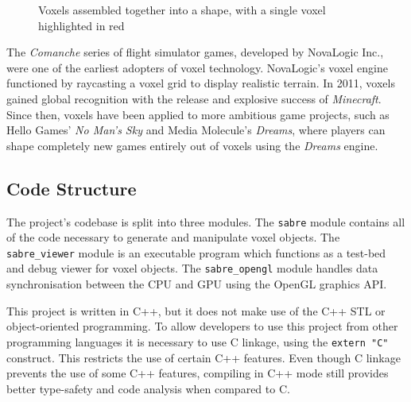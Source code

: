 \begin{figure}[h]
    \centering
    
    \caption{Voxels assembled together into a shape, with a single voxel highlighted in red \autocite{wiki:voxels_svg}}
    \label{fig:voxels_demo}
\end{figure}

The \textit{Comanche} series of flight simulator games, developed by NovaLogic Inc., 
were one of the earliest adopters of voxel technology. NovaLogic's voxel engine 
functioned by raycasting a voxel grid to display realistic terrain. In 2011, voxels 
gained global recognition with the release and explosive success of 
\textit{Minecraft}. Since then, voxels have been applied to more ambitious game 
projects, such as Hello Games' \textit{No Man's Sky} and Media Molecule's 
\textit{Dreams}, where players can shape completely new games entirely out of voxels 
using the \textit{Dreams} engine.

\subsection{Code Structure}
The project's codebase is split into three modules. The \texttt{sabre} module contains all of the code necessary to generate and manipulate voxel objects. The \texttt{sabre\_viewer} module is an executable program which functions as a test-bed and debug viewer for voxel objects. The \texttt{sabre\_opengl} module handles data synchronisation between the CPU and GPU using the OpenGL graphics API.

This project is written in C++, but it does not make use of the C++ STL or object-oriented programming. To allow developers to use this project from other programming languages it is necessary to use C linkage, using the \texttt{extern "C"} construct. This restricts the use of certain C++ features. Even though C linkage prevents the use of some C++ features, compiling in C++ mode still provides better type-safety and code analysis when compared to C.

